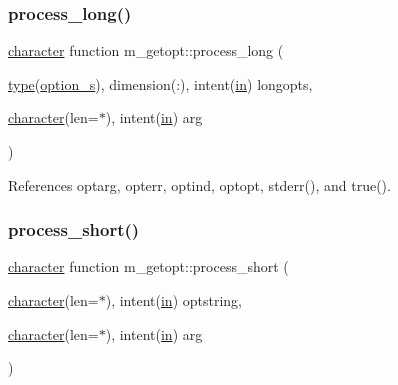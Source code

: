 \mbox{\label{namespacem__getopt_a47714553b3cda11df4d21bc343760d9c}} 
\subsubsection{\texorpdfstring{process\+\_\+long()}{process\_long()}}
{\footnotesize\ttfamily \hyperlink{option__stopwatch_83_8txt_abd4b21fbbd175834027b5224bfe97e66}{character} function m\+\_\+getopt\+::process\+\_\+long (\begin{DoxyParamCaption}\item[{\hyperlink{stop__watch_83_8txt_a70f0ead91c32e25323c03265aa302c1c}{type}(\hyperlink{structm__getopt_1_1option__s}{option\+\_\+s}), dimension(\+:), intent(\hyperlink{M__journal_83_8txt_afce72651d1eed785a2132bee863b2f38}{in})}]{longopts,  }\item[{\hyperlink{option__stopwatch_83_8txt_abd4b21fbbd175834027b5224bfe97e66}{character}(len=$\ast$), intent(\hyperlink{M__journal_83_8txt_afce72651d1eed785a2132bee863b2f38}{in})}]{arg }\end{DoxyParamCaption})}



References optarg, opterr, optind, optopt, stderr(), and true().

\mbox{\label{namespacem__getopt_a5a41350043ae3b92dbbac7dea6702e09}} 
\subsubsection{\texorpdfstring{process\+\_\+short()}{process\_short()}}
{\footnotesize\ttfamily \hyperlink{option__stopwatch_83_8txt_abd4b21fbbd175834027b5224bfe97e66}{character} function m\+\_\+getopt\+::process\+\_\+short (\begin{DoxyParamCaption}\item[{\hyperlink{option__stopwatch_83_8txt_abd4b21fbbd175834027b5224bfe97e66}{character}(len=$\ast$), intent(\hyperlink{M__journal_83_8txt_afce72651d1eed785a2132bee863b2f38}{in})}]{optstring,  }\item[{\hyperlink{option__stopwatch_83_8txt_abd4b21fbbd175834027b5224bfe97e66}{character}(len=$\ast$), intent(\hyperlink{M__journal_83_8txt_afce72651d1eed785a2132bee863b2f38}{in})}]{arg }\end{DoxyParamCaption})}



